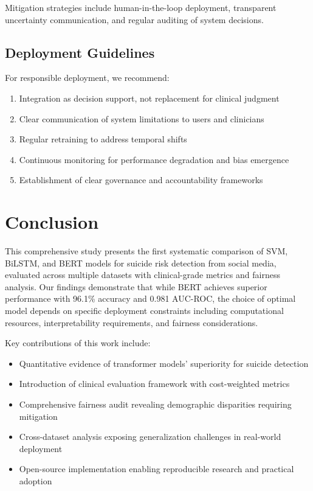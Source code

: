 \documentclass[conference]{IEEEtran}
\begin{document}
Mitigation strategies include human-in-the-loop deployment, transparent uncertainty communication, and regular auditing of system decisions.

\subsection{Deployment Guidelines}

For responsible deployment, we recommend:
\begin{enumerate}
    \item Integration as decision support, not replacement for clinical judgment
    \item Clear communication of system limitations to users and clinicians
    \item Regular retraining to address temporal shifts
    \item Continuous monitoring for performance degradation and bias emergence
    \item Establishment of clear governance and accountability frameworks
\end{enumerate}

\section{Conclusion}

This comprehensive study presents the first systematic comparison of SVM, BiLSTM, and BERT models for suicide risk detection from social media, evaluated across multiple datasets with clinical-grade metrics and fairness analysis. Our findings demonstrate that while BERT achieves superior performance with 96.1\% accuracy and 0.981 AUC-ROC, the choice of optimal model depends on specific deployment constraints including computational resources, interpretability requirements, and fairness considerations.

Key contributions of this work include:
\begin{itemize}
    \item Quantitative evidence of transformer models' superiority for suicide detection
    \item Introduction of clinical evaluation framework with cost-weighted metrics
    \item Comprehensive fairness audit revealing demographic disparities requiring mitigation
    \item Cross-dataset analysis exposing generalization challenges in real-world deployment
    \item Open-source implementation enabling reproducible research and practical adoption
\end{itemize}
\end{document}
